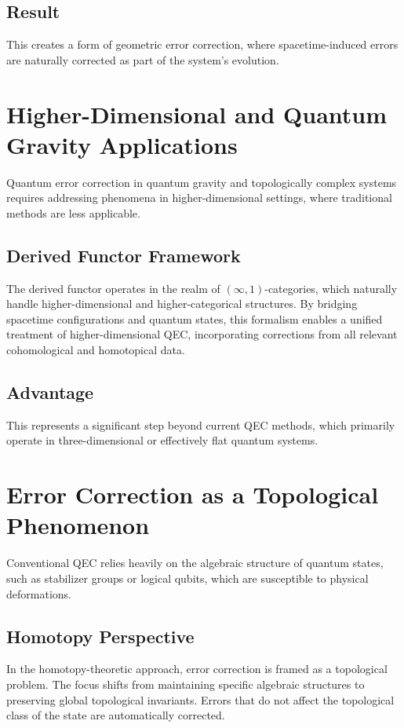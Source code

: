 \documentclass[11pt]{article}
\begin{document}
\subsection{Result}
This creates a form of geometric error correction, where spacetime-induced errors are naturally corrected as part of the system’s evolution.

\section{Higher-Dimensional and Quantum Gravity Applications}
Quantum error correction in quantum gravity and topologically complex systems requires addressing phenomena in higher-dimensional settings, where traditional methods are less applicable.

\subsection{Derived Functor Framework}
The derived functor operates in the realm of \((\infty,1)\)-categories, which naturally handle higher-dimensional and higher-categorical structures. By bridging spacetime configurations and quantum states, this formalism enables a unified treatment of higher-dimensional QEC, incorporating corrections from all relevant cohomological and homotopical data.

\subsection{Advantage}
This represents a significant step beyond current QEC methods, which primarily operate in three-dimensional or effectively flat quantum systems.

\section{Error Correction as a Topological Phenomenon}
Conventional QEC relies heavily on the algebraic structure of quantum states, such as stabilizer groups or logical qubits, which are susceptible to physical deformations.

\subsection{Homotopy Perspective}
In the homotopy-theoretic approach, error correction is framed as a topological problem. The focus shifts from maintaining specific algebraic structures to preserving global topological invariants. Errors that do not affect the topological class of the state are automatically corrected.
\end{document}
